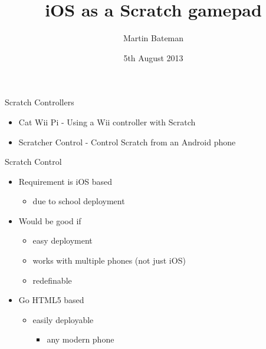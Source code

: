 \documentclass[ignorenonframetext,t]{beamer}
\title{iOS as a Scratch gamepad}
\author[M. Bateman]{Martin Bateman}
\date{5th August 2013}
\begin{document}
\frame{
\maketitle
}


\begin{frame}{Scratch Controllers}
\begin{itemize}
	\item Cat Wii Pi\cite{catwiipi} - Using a Wii controller with Scratch
	\item Scratcher Control\cite{scratchercontrol} - Control Scratch from an Android phone
\end{itemize}
\end{frame}

\begin{frame}{Scratch Control}
\begin{itemize}
	\item Requirement is iOS based
	\begin{itemize}
		\item due to school deployment
	\end{itemize}
	\item Would be good if
	\begin{itemize}
		\item easy deployment
		\item works with multiple phones (not just iOS)
		\item redefinable
	\end{itemize}
	\bigskip
	\item Go HTML5 based
	\begin{itemize}
		\item easily deployable
		\begin{itemize}
			\item any modern phone
		\end{itemize}
	\end{itemize}
\end{itemize}
\end{frame}
\end{document}
